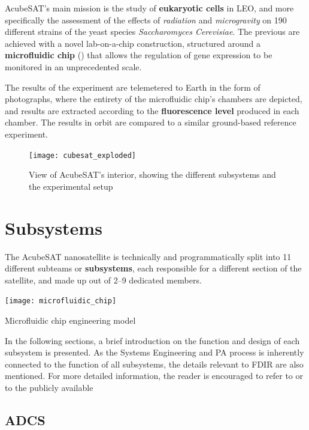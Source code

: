 \documentclass[a4paper,nobib,final]{tufte-book}
\begin{document}
AcubeSAT's main mission is the study of \textbf{eukaryotic cells} in \acl{LEO}, and more specifically the assessment of the effects of \emph{radiation} and \emph{microgravity} on 190 different strains of the yeast species \emph{Saccharomyces Cerevisiae}. The previous are achieved with a novel lab-on-a-chip construction, structured around a \textbf{microfluidic chip} () \autocite{volpetti_microfluidic_biodisplay_2017} that allows the regulation of gene expression to be monitored in an unprecedented scale.

The results of the experiment are telemetered to Earth in the form of photographs, where the entirety of the microfluidic chip's chambers are depicted, and results are extracted according to the \textbf{fluorescence level} produced in each chamber. The results in orbit are compared to a similar ground-based reference experiment.

\begin{figure}[t]
	\centering
	\texttt{[image: cubesat\_exploded]}
	\caption{View of AcubeSAT's interior, showing the different subsystems and the experimental setup}
\end{figure}

\section{Subsystems}

The AcubeSAT nanosatellite is technically and programmatically split into 11 different subteams or \textbf{subsystems}, each responsible for a different section of the satellite, and made up out of \SIrange{2}{9}{} dedicated members.

\begin{marginfigure}
	\texttt{[image: microfluidic\_chip]}
	\caption{Microfluidic chip engineering model}
	\label{fig:microfluidic_chip}
\end{marginfigure}

In the following sections, a brief introduction on the function and design of each subsystem is presented. As the Systems Engineering and \acl{PA} process is inherently connected to the function of all subsystems, the details relevant to \acs{FDIR} are also mentioned. For more detailed information, the reader is encouraged to refer to  or to the publicly available 
\subsection{\acf{ADCS}}
\label{sec:adcs}
\end{document}
